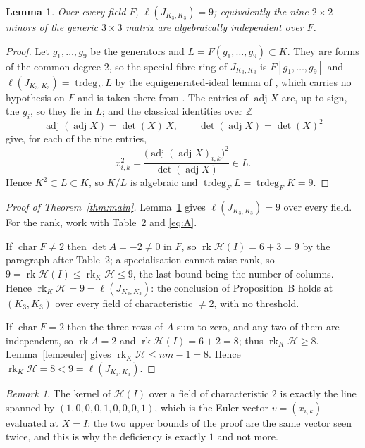 \documentclass[11pt]{amsart}
\newtheorem{lemma}[theorem]{Lemma}
\theoremstyle{remark}
\newtheorem*{remark}{Remark}
\DeclareMathOperator{\rk}{rk}
\DeclareMathOperator{\trdeg}{trdeg}
\DeclareMathOperator{\adj}{adj}
\newcommand{\Hm}{\mathcal H}
\begin{document}
\begin{lemma}\label{lem:spread}
Over every field $F$, $\ell(J_{K_3,K_3})=9$; equivalently the nine $2\times2$
minors of the generic $3\times3$ matrix are algebraically independent over $F$.
\end{lemma}

\begin{proof}
Let $g_1,\ldots,g_9$ be the generators and $L=F(g_1,\ldots,g_9)\subset K$.
They are forms of the common degree $2$, so the special fibre ring of
$J_{K_3,K_3}$ is $F[g_1,\ldots,g_9]$ and
$\ell(J_{K_3,K_3})=\trdeg_FL$ by the equigenerated-ideal lemma of \cite{LN},
which carries no hypothesis on $F$ and is taken there from
\cite[Proposition 4.8]{HeinzerKim}. The entries of $\adj X$ are, up to sign,
the $g_i$, so they lie in $L$; and the classical identities over $\mathbb Z$
\[
 \adj(\adj X)=\det(X)\,X,
 \qquad
 \det(\adj X)=\det(X)^2
\]
give, for each of the nine entries,
\[
 x_{i,k}^2=\frac{\bigl(\adj(\adj X)_{i,k}\bigr)^2}{\det(\adj X)}\in L .
\]
Hence $K^2\subset L\subset K$, so $K/L$ is algebraic and
$\trdeg_FL=\trdeg_FK=9$.
\end{proof}

\begin{proof}[Proof of Theorem~\ref{thm:main}]
Lemma~\ref{lem:spread} gives $\ell(J_{K_3,K_3})=9$ over every field. For the
rank, work with Table~2 and \eqref{eq:A}.

If $\operatorname{char}F\neq2$ then $\det A=-2\neq0$ in $F$, so
$\rk\Hm(I)=6+3=9$ by the paragraph after Table~2; a specialisation cannot raise
rank, so $9=\rk\Hm(I)\le\rk_K\Hm\le9$, the last bound being the number of
columns. Hence $\rk_K\Hm=9=\ell(J_{K_3,K_3})$: the conclusion of Proposition~B
holds at $(K_3,K_3)$ over every field of characteristic $\neq2$, with no
threshold.

If $\operatorname{char}F=2$ then the three rows of $A$ sum to zero, and any two
of them are independent, so $\rk A=2$ and $\rk\Hm(I)=6+2=8$; thus
$\rk_K\Hm\ge8$. Lemma~\ref{lem:euler} gives $\rk_K\Hm\le nm-1=8$. Hence
$\rk_K\Hm=8<9=\ell(J_{K_3,K_3})$.
\end{proof}

\begin{remark}
The kernel of $\Hm(I)$ over a field of characteristic $2$ is exactly the line
spanned by $(1,0,0,0,1,0,0,0,1)$, which is the Euler vector $v=(x_{i,k})$
evaluated at $X=I$: the two upper bounds of the proof are the same vector seen
twice, and this is why the deficiency is exactly $1$ and not more.
\end{remark}
\end{document}
